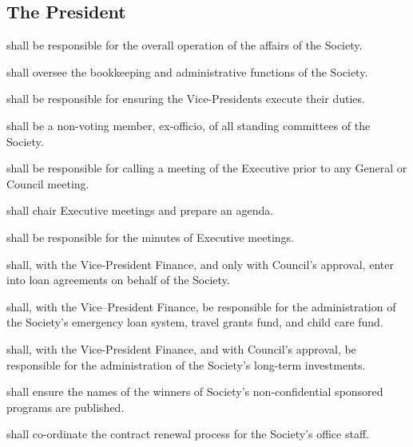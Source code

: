 \subsection {The President}
\begin{longenum}[ label*=\thesubsection.\arabic*., align=left]
	\item shall be responsible for the overall operation of the affairs of the Society.
    \item shall oversee the bookkeeping and administrative functions of the Society. 
    \item shall be responsible for ensuring the Vice-Presidents execute their duties. 
    \item shall be a non-voting member, ex-officio, of all standing committees of the Society.
    \item shall be responsible for calling a meeting of the Executive prior to any General or Council meeting.
    \item shall chair Executive meetings and prepare an agenda.
    \item shall be responsible for the minutes of Executive meetings. 
    \item shall, with the Vice-President Finance, and only with Council's approval, enter into loan agreements on behalf of the Society.
    \item shall, with the Vice--President Finance, be responsible for the administration of the Society's emergency loan system, travel grants fund, and child care fund. 
    \item shall, with the Vice-President Finance, and with Council's approval, be responsible for the administration of the Society's long-term investments. 
    \item shall ensure the names of the winners of Society's non-confidential sponsored programs are published.
    \item shall co-ordinate the contract renewal process for the Society's office staff. 

\end{longenum}
